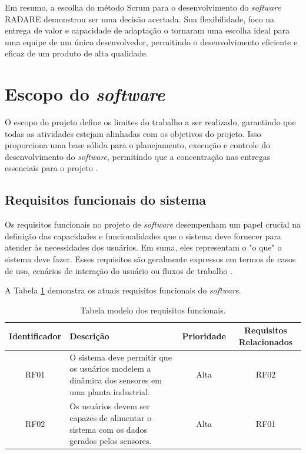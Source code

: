 Em resumo, a escolha do método Scrum para o desenvolvimento do \textit{software} RADARE demonstrou ser uma decisão acertada. Sua flexibilidade, foco na entrega de valor e capacidade de adaptação o tornaram uma escolha ideal para uma equipe de um único desenvolvedor, permitindo o desenvolvimento eficiente e eficaz de um produto de alta qualidade.
        
\section{Escopo do \textit{software}}

O escopo do projeto define os limites do trabalho a ser realizado, garantindo que todas as atividades estejam alinhadas com os objetivos do projeto. Isso proporciona uma base sólida para o planejamento, execução e controle do desenvolvimento do \textit{software}, permitindo que a concentração nas entregas essenciais para o projeto \cite{softwareeng}.
    
\subsection{Requisitos funcionais do sistema}

Os requisitos funcionais no projeto de \textit{software} desempenham um papel crucial na definição das capacidades e funcionalidades que o sistema deve fornecer para atender às necessidades dos usuários. Em suma, eles representam o "o que" o sistema deve fazer. Esses requisitos são geralmente expressos em termos de casos de uso, cenários de interação do usuário ou fluxos de trabalho \cite{softwareengreq}.
        
A Tabela \ref{tab:req_funcional} demonstra os atuais requisitos funcionais do \textit{software}.

\begin{table}[htbp]
\begin{tabularx}{\linewidth}{|c|X|c|c|} \hline
\textbf{Identificador} & 
\textbf{Descrição} & 
\textbf{Prioridade} &
\textbf{Requisitos Relacionados}\\ \hline
RF01 & 
O sistema deve permitir que os usuários modelem a dinâmica dos sensores em uma planta industrial. & 
Alta & 
RF02 \\ \hline
RF02 & 
Os usuários devem ser capazes de alimentar o sistema com os dados gerados pelos sensores. & 
Alta & 
RF01 \\ \hline
\end{tabularx}

\caption{Tabela modelo dos requisitos funcionais.}
\label{tab:req_funcional}
\end{table}

